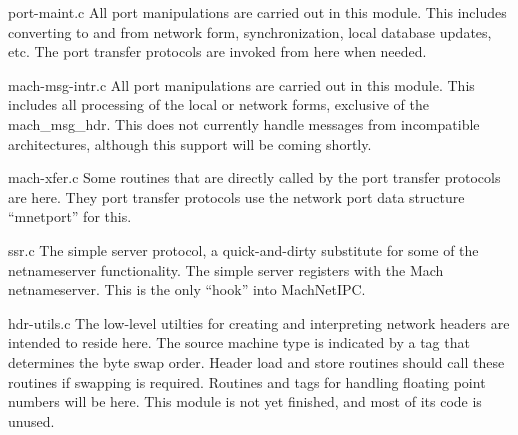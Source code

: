\begin{description}
\item {port-maint.c}
All port manipulations are carried out in this module.  This includes
converting to and from network form, synchronization, local database
updates, etc.  The port transfer protocols are invoked from here
when needed.


\item {mach-msg-intr.c}
All port manipulations are carried out in this module.  This includes
all processing of the local or network forms, exclusive of the
mach\_msg\_hdr.  This does not currently handle messages from
incompatible architectures, although this support will be coming
shortly.

\item {mach-xfer.c}
Some routines that are directly called by the port transfer protocols
are here.  They port transfer protocols use the network port data
structure ``mnetport'' for this.

\item {ssr.c}
The simple server protocol, a quick-and-dirty substitute for some of
the netnameserver functionality.  The simple server registers with
the Mach netnameserver.  This is the only ``hook'' into MachNetIPC.

\item {hdr-utils.c}
The low-level utilties for creating and interpreting network headers
are intended to reside here.  The source machine type is indicated by
a tag that determines the byte swap order.  Header load and store
routines should call these routines if swapping is required.  Routines
and tags for handling floating point numbers will be here.  This
module is not yet finished, and most of its code is unused.

\end{description}

